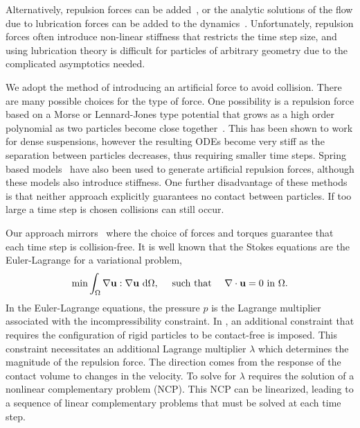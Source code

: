 \documentclass[preprint, 10pt]{elsarticle}
\begin{document}

 Alternatively, repulsion forces can be added~\cite{Malhotra2018}, or
the analytic solutions of the flow due to lubrication forces can be
added to the dynamics~\cite{Mammoli2006}.  Unfortunately, repulsion
forces often introduce non-linear stiffness that restricts the time step
size, and using lubrication theory is difficult for particles of arbitrary
geometry due to the complicated asymptotics needed.

We adopt the method of introducing an artificial force to avoid
collision. There are many possible choices for the type of force. One
possibility is a repulsion force based on a Morse or Lennard-Jones type
potential that grows as a high order polynomial as two particles become
close together~\cite{Flormann2017, Liu2006}. This has been shown to work
for dense suspensions, however the resulting ODEs become very stiff as
the separation between particles decreases, thus requiring smaller time
steps. Spring based models~\cite{Tsubota2006, Zhao2013, Kabacogulu2017}
have also been used to generate artificial repulsion forces, although
these models also introduce stiffness. One further disadvantage of these
methods is that neither approach explicitly guarantees no contact
between particles. If too large a time step is chosen collisions can
still occur. 


Our approach mirrors~\cite{Lu2017} where the choice of forces and
torques guarantee that each time step is collision-free.
It is well known that the Stokes equations are the Euler-Lagrange
for a variational problem,
\begin{align*}
  \min \int_{\Omega} \nabla{\mathbf{u}}:\nabla{\mathbf{u}}~\text{d}\Omega,
  \quad\text{ such that }\quad \nabla\cdot{\mathbf{u}} = 0 \text{ in }\Omega.
\end{align*} 
In the Euler-Lagrange equations, the pressure $p$ is the Lagrange
multiplier associated with the incompressibility constraint. In \cite{Lu2017}, an
additional constraint that requires the configuration of rigid particles
to be contact-free is imposed. This constraint necessitates an
additional Lagrange multiplier $\lambda$ which determines the magnitude
of the repulsion force. The direction comes from the response of the
contact volume to changes in the velocity. To solve for $\lambda$
requires the solution of a nonlinear complementary problem (NCP). This
NCP can be linearized, leading to a sequence of linear complementary
problems that must be solved at each time step.
\end{document}
